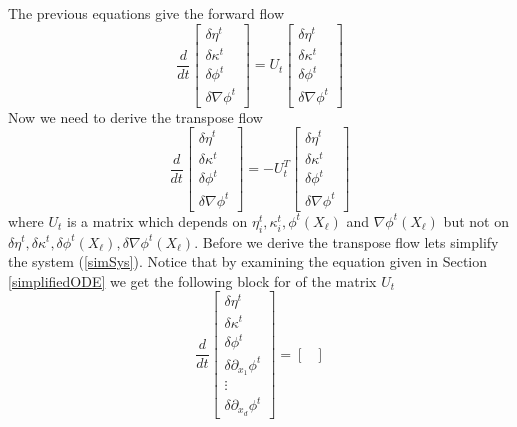 \documentclass[noinfoline]{imsart}
\begin{document}
{The previous equations give the forward flow
\begin{equation}
\frac{d}{dt} \left[\begin{array}{c} \delta\eta^t\\ \delta \kappa^t \\ \delta\phi^t \\ \delta \nabla\phi^t   \end{array}\right]
= U_t  \left[\begin{array}{c} \delta\eta^t\\ \delta \kappa^t \\ \delta\phi^t \\ \delta\nabla\phi^t   \end{array}\right]
\end{equation}
Now we need to derive the transpose flow
\begin{equation}
\label{simSys}
\frac{d}{dt} \left[\begin{array}{c} \delta\eta^t\\ \delta \kappa^t \\ \delta\phi^t \\ \delta \nabla\phi^t   \end{array}\right]
= -U_t^T  \left[\begin{array}{c} \delta\eta^t\\ \delta \kappa^t \\ \delta\phi^t \\ \delta\nabla\phi^t   \end{array}\right]
\end{equation}
where $U_t$ is a matrix which depends on $\eta^t_i, \kappa^t_i, \phi^t(X_\ell) $ and $\nabla\phi^t(X_\ell)$ but not on  $\delta\eta^t, \delta\kappa^t, \delta\phi^t(X_\ell), \delta \nabla\phi^t(X_\ell)$.
Before we derive the transpose flow lets simplify the system (\ref{simSys}). Notice that by examining the equation given in Section \ref{simplifiedODE} we get the following block for of the matrix $U_{t}$
\begin{equation}
\frac{d}{dt} \left[\begin{array}{c} \delta\eta^t\\ \delta \kappa^t \\ \delta\phi^t \\ \delta\partial_{x_1} \phi^t  \\ \vdots \\ \delta\partial_{x_d} \phi^t   \end{array}\right]
=
\begin{bmatrix}

\end{bmatrix}
\end{equation}}
\end{document}
